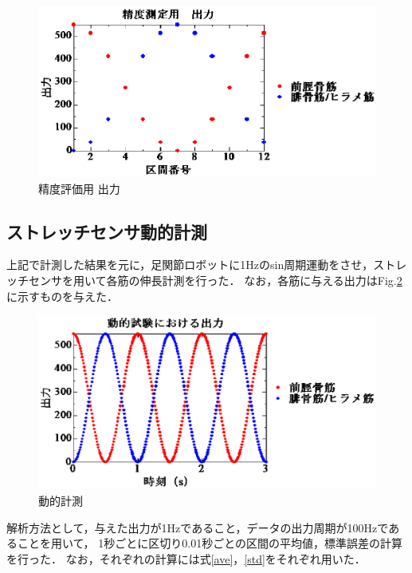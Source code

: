 \begin{figure}[h]
    \begin{center}
        \includegraphics[width=0.76\columnwidth,clip]{2_measurement/output/output.eps}
        \caption{精度評価用 出力}
        \label{output_for_test}
    \end{center}
\end{figure}

\newpage

\subsection{ストレッチセンサ動的計測}
上記で計測した結果を元に，足関節ロボットに1Hzのsin周期運動をさせ，ストレッチセンサを用いて各筋の伸長計測を行った．
なお，各筋に与える出力はFig.\ref{output_for_actions}に示すものを与えた．

\begin{figure}[h]
  \begin{center}
  \includegraphics[width=0.76\columnwidth,clip]{3_analysis/outPut/putPut.eps}
  \caption{動的計測}
  \label{output_for_actions}
  \end{center}
\end{figure}

解析方法として，与えた出力が1Hzであること，データの出力周期が100Hzであることを用いて，
1秒ごとに区切り0.01秒ごとの区間の平均値，標準誤差の計算を行った．
なお，それぞれの計算には式\ref{ave}，\ref{std}をそれぞれ用いた．
